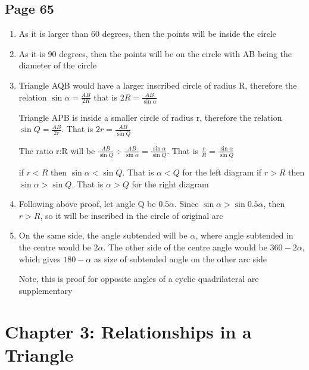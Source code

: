 \documentclass{article}
\newenvironment{solutions}[1]
{\subsection*{#1}
 \begin{enumerate}[leftmargin=1.5em]}
{\end{enumerate}}
\newcommand{\solution}{\item}
\begin{document}
\begin{solutions}{Page 65}
\solution
As it is larger than 60 degrees, then the points will be inside the circle
\solution

As it is 90 degrees, then the points will be on the circle with AB being the diameter of the circle
\solution
Triangle AQB would have a larger inscribed circle of radius R, therefore the relation $\sin \alpha = \frac{AB}{2R}$ that is $2R = \frac{AB}{\sin \alpha}$

Triangle APB is inside a smaller circle of radius r, therefore the relation $\sin Q = \frac{AB}{2r}$. That is $2r = \frac{AB}{\sin Q}$

The ratio r:R will be $\frac{AB}{\sin Q} \div \frac{AB}{\sin \alpha} = \frac{\sin \alpha}{\sin Q}$. That is $\frac{r}{R}=\frac{\sin \alpha}{\sin Q}$

if $r < R$ then $\sin \alpha < \sin Q$. That is $\alpha < Q$ for the left diagram
if $r > R$ then $\sin \alpha > \sin Q$. That is $\alpha > Q$ for the right diagram

\solution
Following above proof, let angle Q be $0.5\alpha$. Since $\sin \alpha > \sin 0.5\alpha$, then $r>R$, so it will be inscribed in the circle of original arc
\solution

On the same side, the angle subtended will be $\alpha$, where angle subtended in the centre would be $2\alpha$. The other side of the centre angle would be $360-2\alpha$, which gives $180-\alpha$ as size of subtended angle on the other arc side

Note, this is proof for opposite angles of a cyclic quadrilateral are supplementary

\end{solutions}


\section*{Chapter 3: Relationships in a Triangle}
\end{document}
